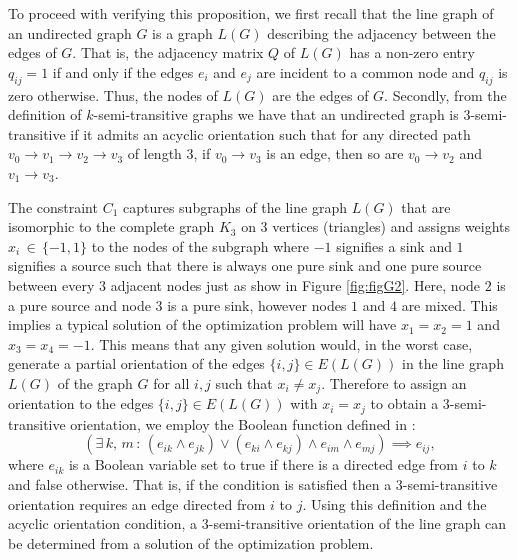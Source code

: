 \documentclass{article}
\begin{document}
To proceed with verifying this proposition, we first recall that the line graph of an undirected graph $G$ is a graph $L(G)$ describing the adjacency between the edges of $G$. That is, the adjacency matrix $Q$ of $L(G)$ has a non-zero entry $q_{ij}=1$ if and only if the edges $e_{i}$ and $e_{j}$ are incident to a common node and $q_{ij}$ is zero otherwise. Thus, the nodes of $L(G)$ are the edges of $G$. Secondly, from the definition of $k$-semi-transitive graphs we have that an undirected graph is $3$-semi-transitive if it admits an acyclic orientation such that for any directed path
$v_{0} \rightarrow v_{1} \rightarrow v_{2} \rightarrow v_{3}$ of length 3, if $v_{0} \rightarrow v_{3} $ is an edge, then so are $v_{0} \rightarrow v_{2}$ and $v_{1} \rightarrow v_{3}$.

The constraint $C_{1}$ captures subgraphs of the line graph $L(G)$ that are isomorphic to the complete graph $K_{3}$ on 3 vertices (triangles) and assigns weights $x_{i}\, \in \,\{-1,1\}$ to the nodes of the subgraph where $-1$ signifies a sink and $1$ signifies a source such that there is always one pure sink and one pure source between every 3 adjacent nodes just as show in Figure \ref{fig:figG2}. Here, node $2$ is a pure source and node $3$ is a pure sink, however nodes $1$ and $4$ are mixed. This implies a typical solution of the optimization problem will have $x_{1}=x_{2}=1$ and $x_{3}=x_{4}=-1$. This means that any given solution would, in the worst case, generate a partial orientation of the edges $\{i,j\}\in E(L(G))$ in the line graph $L(G)$ of the graph $G$ for all $i,j$ such that $x_{i}\neq x_{j}$. Therefore to assign an orientation to the edges $\{i,j\}\in E(L(G))$ with $x_{i}=x_{j}$ to obtain a 3-semi-transitive orientation, we employ the Boolean function defined in \cite{SMT2019} : \begin{equation}
\label{eq:sergey3-semi}
        \left(\exists\, k,\,m \,:\, (e_{ik}\land e_{jk})\lor(e_{ki}\land e_{kj})\land e_{im} \land e_{mj} \right)\implies e_{ij},
    \end{equation}
    where $e_{ik}$ is a Boolean variable set to true if there is a directed edge from $i$ to $k$ and false otherwise. That is, if the condition is satisfied then a 3-semi-transitive orientation requires an edge directed from $i$ to $j$. Using this definition and the acyclic orientation condition, a 3-semi-transitive orientation of the line graph can be determined from a solution of the optimization problem. 
\end{document}

